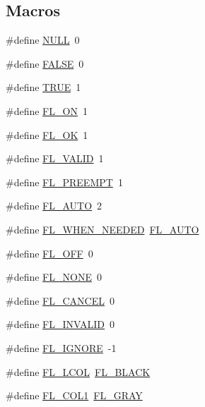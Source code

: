 \subsection*{Macros}
\begin{DoxyCompactItemize}
\item 
\#define \hyperlink{forms_8_h_a070d2ce7b6bb7e5c05602aa8c308d0c4}{N\+U\+LL}~0
\item 
\#define \hyperlink{forms_8_h_aa93f0eb578d23995850d61f7d61c55c1}{F\+A\+L\+SE}~0
\item 
\#define \hyperlink{forms_8_h_aa8cecfc5c5c054d2875c03e77b7be15d}{T\+R\+UE}~1
\item 
\#define \hyperlink{forms_8_h_aa88fae48750734d6602ae6a8f0ef0f8b}{F\+L\+\_\+\+ON}~1
\item 
\#define \hyperlink{forms_8_h_a9507edb6dcc7d07d194a02edae09fe32}{F\+L\+\_\+\+OK}~1
\item 
\#define \hyperlink{forms_8_h_a6d31d90bd3d738c8adde389c9664b738}{F\+L\+\_\+\+V\+A\+L\+ID}~1
\item 
\#define \hyperlink{forms_8_h_aa02a8b94e1575c824da61ef31b5c8059}{F\+L\+\_\+\+P\+R\+E\+E\+M\+PT}~1
\item 
\#define \hyperlink{forms_8_h_a86d3d92d1e70f124863a648193e531fb}{F\+L\+\_\+\+A\+U\+TO}~2
\item 
\#define \hyperlink{forms_8_h_abf9873f067ce45d6dd317d76636ab982}{F\+L\+\_\+\+W\+H\+E\+N\+\_\+\+N\+E\+E\+D\+ED}~\hyperlink{forms_8_h_a86d3d92d1e70f124863a648193e531fb}{F\+L\+\_\+\+A\+U\+TO}
\item 
\#define \hyperlink{forms_8_h_a21291f75ecb0310e1fa1db667d2359e4}{F\+L\+\_\+\+O\+FF}~0
\item 
\#define \hyperlink{forms_8_h_a03f4bd5ab8b04f454eb2480656e3dec9}{F\+L\+\_\+\+N\+O\+NE}~0
\item 
\#define \hyperlink{forms_8_h_a1f121677be8fc0fbc5cebda340015d42}{F\+L\+\_\+\+C\+A\+N\+C\+EL}~0
\item 
\#define \hyperlink{forms_8_h_acfc46bd44d08e773385466f2fa2658b7}{F\+L\+\_\+\+I\+N\+V\+A\+L\+ID}~0
\item 
\#define \hyperlink{forms_8_h_a2f4c4a79d116dcfd7a5f2314816ef509}{F\+L\+\_\+\+I\+G\+N\+O\+RE}~-\/1
\item 
\#define \hyperlink{forms_8_h_a10b4ed983b8f6e42a05aaa9be0e51c65}{F\+L\+\_\+\+L\+C\+OL}~\hyperlink{_enumerations_8_h_a705ea07a3ad2b7e3b7745c9c3c651bba}{F\+L\+\_\+\+B\+L\+A\+CK}
\item 
\#define \hyperlink{forms_8_h_aa253d96cb0b4ac3fca0ebebac45ea132}{F\+L\+\_\+\+C\+O\+L1}~\hyperlink{_enumerations_8_h_aabb3b3628ea5baa2ba176201ed5d2aba}{F\+L\+\_\+\+G\+R\+AY}

\end{DoxyCompactItemize}

